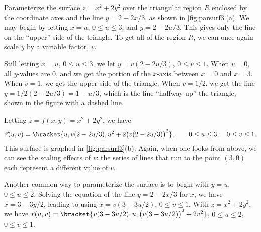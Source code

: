 \begin{example}\label{ex_parsurf3}
Parameterize the surface $z=x^2+2y^2$ over the triangular region $R$ enclosed by the coordinate axes and the line $y=2-2x/3$, as shown in \autoref{fig:parsurf3}(a).
\solution
We may begin by letting $x=u$, $0\leq u\leq 3$,  and $y = 2-2u/3$. This gives only the line on the ``upper'' side of the triangle. To get all of the region $R$, we can once again scale $y$ by a variable factor, $v$.

Still letting $x = u$, $0\leq u\leq 3$, we let $y = v(2-2u/3)$, $0\leq v\leq 1$. When $v=0$, all $y$-values are 0, and we get the portion of the $x$-axis between $x=0$ and $x=3$. When $v=1$, we get the upper side of the triangle. When $v=1/2$, we get the line $y=1/2(2-2u/3) = 1-u/3$, which is the line ``halfway up'' the triangle, shown in the figure with a dashed line.

Letting $z = f(x,y) = x^2+2y^2$, we have
\[
\vec r(u,v) =\bracket{u, v(2-2u/3), u^2+2\bigl(v(2-2u/3)\bigr)^2},
\qquad 0\leq u\leq 3,\quad 0\leq v\leq 1.
\]
This surface is graphed in \autoref{fig:parsurf3}(b). Again, when one looks from above, we can see the scaling effects of $v$: the series of lines that run to the point $(3,0)$ each represent a different value of $v$.

Another common way to parameterize the surface is to begin with $y=u$, $0\leq u\leq 2$. Solving the equation of the line $y=2-2x/3$ for $x$, we have $x = 3-3y/2$, leading to using $x=v(3-3u/2)$, $0\leq v\leq 1$. With $z=x^2+2y^2$, we have $\vec r(u,v) =\bracket{v(3-3u/2),u, \bigl(v(3-3u/2)\bigr)^2+2v^2}$, $0\leq u\leq 2$, $0\leq v\leq 1$.
\end{example}

